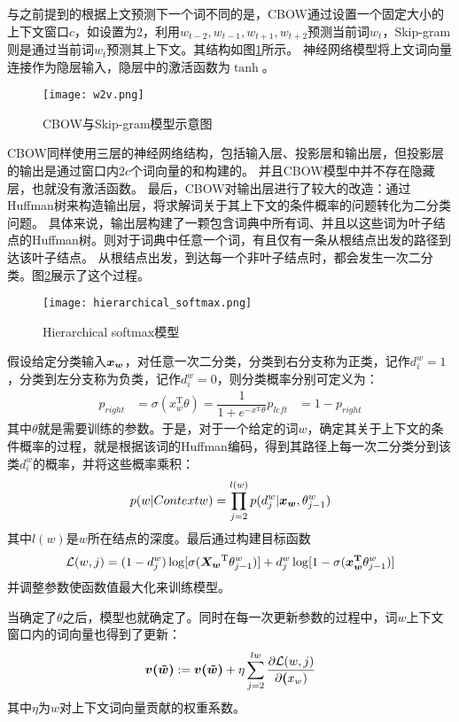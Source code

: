 与之前提到的根据上文预测下一个词不同的是，CBOW通过设置一个固定大小的上下文窗口$c$，如设置为2，利用$w_{t-2}, w_{t-1}, w_{t+1}, w_{t+2}$预测当前词$w_t$，Skip-gram则是通过当前词$w_t$预测其上下文。其结构如图\ref{fig:w2v}所示。
神经网络模型将上文词向量连接作为隐层输入，隐层中的激活函数为$\tanh$。
\begin{figure}[!htpb]
    \centering
    \texttt{[image: w2v.png]}
    \caption{CBOW与Skip-gram模型示意图}
    \label{fig:w2v}
\end{figure}
CBOW同样使用三层的神经网络结构，包括输入层、投影层和输出层，但投影层的输出是通过窗口内$2c$个词向量的和构建的。
并且CBOW模型中并不存在隐藏层，也就没有激活函数。
最后，CBOW对输出层进行了较大的改造：通过Huffman树来构造输出层，将求解词关于其上下文的条件概率的问题转化为二分类问题。
具体来说，输出层构建了一颗包含词典中所有词、并且以这些词为叶子结点的Huffman树。则对于词典中任意一个词，有且仅有一条从根结点出发的路径到达该叶子结点。
从根结点出发，到达每一个非叶子结点时，都会发生一次二分类。图\ref{fig:hierarchical_softmax}展示了这个过程。
\begin{figure}[!htpb]
    \centering
    \texttt{[image: hierarchical\_softmax.png]}
    \caption{Hierarchical softmax模型}
    \label{fig:hierarchical_softmax}
\end{figure}
假设给定分类输入$\boldsymbol{x_w}$，对任意一次二分类，分类到右分支称为正类，记作$d^w_i=1$，分类到左分支称为负类，记作$d^w_i=0$，则分类概率分别可定义为：
\begin{align}
    p_{right} &= \sigma(x_w^\mathrm{T}\theta) = \dfrac{1}{1+e^{-x^\mathrm{T}\theta}}
    p_{left} &= 1 - p_{right}
\end{align}
其中$\theta$就是需要训练的参数。于是，对于一个给定的词$w$，确定其关于上下文的条件概率的过程，就是根据该词的Huffman编码，得到其路径上每一次二分类分到该类$d^w_i$的概率，并将这些概率乘积：
\begin{equation}
    p(w|Context{w}) = \prod^{l(w)}_{j=2}p(d^w_j|\boldsymbol{x_w}, \theta^w_{j-1})
\end{equation}
其中$l(w)$是$w$所在结点的深度。最后通过构建目标函数
\begin{equation}
    \mathcal{L}(w,j) = (1-d^w_j)\log[\sigma(\boldsymbol{X_w}^\mathrm{T}\theta^w_{j-1})] + d^w_j\log[1-\sigma (\boldsymbol{x_w^\mathrm{T}}\theta^w_{j-1})]
\end{equation}
并调整参数使函数值最大化来训练模型。

当确定了$\theta$之后，模型也就确定了。同时在每一次更新参数的过程中，词$w$上下文窗口内的词向量也得到了更新：
\begin{equation}
    \boldsymbol{v(\tilde{w})} := \boldsymbol{v(\tilde{w})} + \eta\sum^{l{w}}_{j=2}\dfrac{\partial\mathcal{L}(w,j)}{\partial \boldsymbol{(}x_w)}
\end{equation}
其中$\eta$为$w$对上下文词向量贡献的权重系数。

